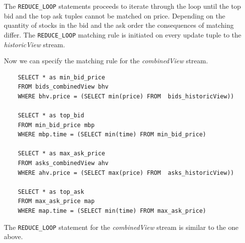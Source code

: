 \documentclass{article}
\begin{document}
The {\tt REDUCE\_LOOP} statements proceeds to iterate through the loop until the top bid and the top ask tuples cannot be matched on price. Depending on the quantity of stocks in the bid and the ask order the consequences of matching differ. The {\tt REDUCE\_LOOP} matching rule is initiated on every update tuple to the \emph{historicView} stream. 

Now we can specify the matching rule for the \emph{combinedView} stream.

\begin{verbatim}      
    SELECT * as min_bid_price
    FROM bids_combinedView bhv
    WHERE bhv.price = (SELECT min(price) FROM  bids_historicView))
    
    SELECT * as top_bid
    FROM min_bid_price mbp
    WHERE mbp.time = (SELECT min(time) FROM min_bid_price)
    
    SELECT * as max_ask_price
    FROM asks_combinedView ahv
    WHERE ahv.price = (SELECT max(price) FROM  asks_historicView))
    
    SELECT * as top_ask
    FROM max_ask_price map
    WHERE map.time = (SELECT min(time) FROM max_ask_price)
\end{verbatim}

The {\tt REDUCE\_LOOP} statement for the \emph{combinedView} stream is similar to the one above. 
\end{document}
